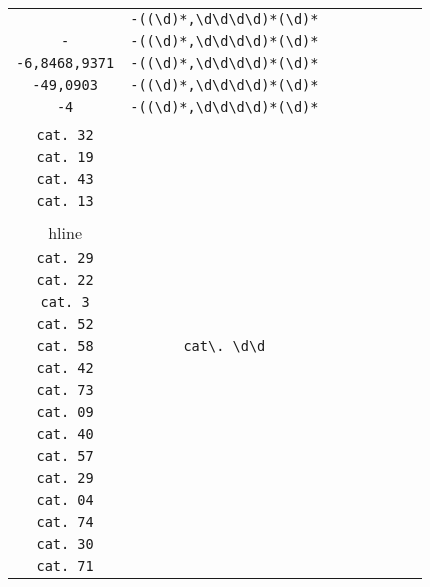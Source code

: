 \begin{longtable}{cccccccc}
\begin{tabular}{ll}
    \verb|-6| & \verb|-((\d)*,\d\d\d\d)*(\d)*|\\
\verb|-| & \verb|-((\d)*,\d\d\d\d)*(\d)*|\\
\verb|-6,8468,9371| & \verb|-((\d)*,\d\d\d\d)*(\d)*|\\
\verb|-49,0903| & \verb|-((\d)*,\d\d\d\d)*(\d)*|\\
\verb|-4| & \verb|-((\d)*,\d\d\d\d)*(\d)*|
\end{tabular}
\\\midrule 
\begin{tabular}{l}
    \verb|cat. 16|\\
\verb|cat. 32|\\
\verb|cat. 19|\\
\verb|cat. 43|\\
\verb|cat. 13|\\
\\hline\\
\verb|cat. 29|\\
\verb|cat. 22|\\
\verb|cat. 3|\\
\verb|cat. 52|\\
\verb|cat. 58|
\end{tabular}

&
\verb|cat\. \d\d|
&

\begin{tabular}{l}
    \verb|cat\. \d\d|\\
\verb|cat. 42|\\
\verb|cat. 73|\\
\verb|cat. 09|\\
\verb|cat. 40|\\
\verb|cat. 57|
\end{tabular}

&

\begin{tabular}{l}
    \verb|cat\. \d\d|\\
\verb|cat. 29|\\
\verb|cat. 04|\\
\verb|cat. 74|\\
\verb|cat. 30|\\
\verb|cat. 71|
\end{tabular}

&


\end{longtable}
